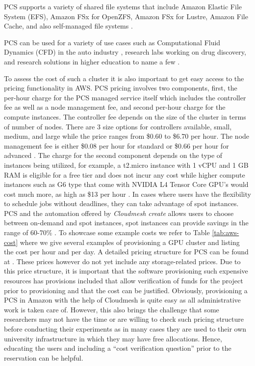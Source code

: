 \documentclass[utf8]{FrontiersinVancouver} %
\begin{document}
PCS supports a variety of shared file systems that include Amazon Elastic File System (EFS), Amazon FSx for OpenZFS, Amazon FSx for Lustre, Amazon File Cache, and also self-managed file systems \citep{awspcsstorage:online}.

PCS can be used for a variety of use cases such as Computational Fluid Dynamics (CFD) in the auto industry \citep{CFD:online}, research labs working on drug discovery, and research solutions in higher education to name a few \citep{awspcsblob1:online}. 

To assess the cost of such a cluster it is also important to get easy access to the pricing functionality in AWS.
PCS pricing involves two components, first, the per-hour charge for the PCS managed service itself which includes the controller fee as well as a node management fee, and second per-hour charge for the compute instances. The controller fee depends on the size of the cluster in terms of number of nodes. There are 3 size options for controllers available, small, medium, and large while the price ranges from \$0.60 to \$6.70 per hour. The node management fee is either \$0.08 per hour for standard or \$0.66 per hour for advanced \citep{HPCpricing:online}. The charge for the second component depends on the type of instances being utilized, for example, a t2.micro instance with 1 vCPU and 1 GB RAM is eligible for a free tier and does not incur any cost while higher compute instances such as G6 type that come with NVIDIA L4 Tensor Core GPU's would cost much more, as high as \$13 per hour \citep{ec2ondemand:online}. In cases where users have the flexibility to schedule jobs without deadlines, they can take advantage of spot instances. PCS and the automation offered by {\em Cloudmesh create} allows users to choose between on-demand and spot instances, spot instances can provide savings in the range of 60-70\% \citep{spotSavings:online}.
To showcase some example costs we refer to Table \ref{tab:aws-cost} where we give several examples of provisioning a GPU cluster and listing the cost per hour and per day. A detailed pricing structure for PCS can be found at \citep{www-aws-pricing}. 
These prices however do not yet include any storage-related prices. Due to this price structure, it is important that the software provisioning such expensive resources has provisions included that allow verification of funds for the project prior to provisioning and that the cost can be justified. Obviously, provisioning a PCS in Amazon with the help of Cloudmesh is quite easy as all administrative work is taken care of. However, this also brings the challenge that some researchers may not have the time or are willing to check such pricing structure before conducting their experiments as in many cases they are used to their own university infrastructure in which they may have free allocations. Hence, educating the users and including a ``cost verification question'' prior to the reservation can be helpful.
\end{document}
